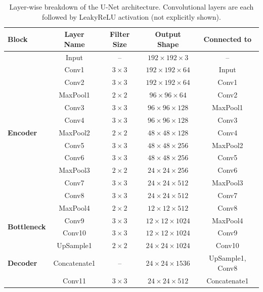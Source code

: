 \begin{table}[htbp]
\centering
\caption{Layer-wise breakdown of the U-Net architecture. Convolutional layers are each followed by LeakyReLU activation (not explicitly shown).}
\label{tab:unet-model}
\renewcommand{\arraystretch}{1.25}
\begin{tabular}{lcccc}
\toprule
\textbf{Block} & \textbf{Layer Name} & \textbf{Filter Size} & \textbf{Output Shape} & \textbf{Connected to} \\ 
\midrule
\multirow{13}{*}{\textbf{Encoder}}
    & Input        & --           & $192 \times 192 \times 3$ & -- \\ 
    & Conv1        & $3 \times 3$ & $192 \times 192 \times 64$ & Input \\ 
    & Conv2        & $3 \times 3$ & $192 \times 192 \times 64$ & Conv1 \\ 
    & MaxPool1     & $2 \times 2$ & $96 \times 96 \times 64$  & Conv2 \\ 
    & Conv3        & $3 \times 3$ & $96 \times 96 \times 128$ & MaxPool1 \\ 
    & Conv4        & $3 \times 3$ & $96 \times 96 \times 128$ & Conv3 \\ 
    & MaxPool2     & $2 \times 2$ & $48 \times 48 \times 128$ & Conv4 \\ 
    & Conv5        & $3 \times 3$ & $48 \times 48 \times 256$ & MaxPool2 \\ 
    & Conv6        & $3 \times 3$ & $48 \times 48 \times 256$ & Conv5 \\ 
    & MaxPool3     & $2 \times 2$ & $24 \times 24 \times 256$ & Conv6 \\ 
    & Conv7        & $3 \times 3$ & $24 \times 24 \times 512$ & MaxPool3 \\ 
    & Conv8        & $3 \times 3$ & $24 \times 24 \times 512$ & Conv7 \\ 
    & MaxPool4     & $2 \times 2$ & $12 \times 12 \times 512$ & Conv8 \\ 
\midrule
\multirow{2}{*}{\textbf{Bottleneck}}
    & Conv9        & $3 \times 3$ & $12 \times 12 \times 1024$ & MaxPool4 \\ 
    & Conv10       & $3 \times 3$ & $12 \times 12 \times 1024$ & Conv9 \\ 
\midrule
\multirow{17}{*}{\textbf{Decoder}}
    & UpSample1    & $2 \times 2$ & $24 \times 24 \times 1024$ & Conv10 \\ 
    & Concatenate1 & --           & $24 \times 24 \times 1536$ & UpSample1, Conv8 \\ 
    & Conv11       & $3 \times 3$ & $24 \times 24 \times 512$  & Concatenate1 \\ 

\end{tabular}
\end{table}
